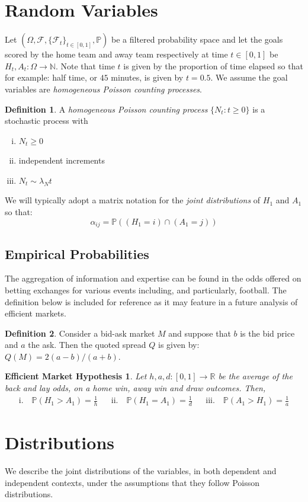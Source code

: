 \documentclass[a4paper,11pt,oneside]{book}
\theoremstyle{plain}
\newtheorem*{emh}{Efficient Market Hypothesis}
\theoremstyle{definition}
\newtheorem{defn}{Definition}[section]
\begin{document}
\section{Random Variables }
Let $(\Omega,\mathcal{F},\{\mathcal{F}_t\}_{t \in [0,1]},\mathbb{P})$ be a filtered probability space and let the goals scored by the home team and away team respectively at time $t \in [0,1]$ be $H_t,A_t:\Omega\rightarrow \mathbb{N}$. Note that time $t$ is given by the proportion of time elapsed so that for example: half time, or $45$ minutes, is given by $t=0.5$. We assume the goal variables are \emph{homogeneous Poisson counting processes}.
\begin{defn} A \emph{homogeneous Poisson counting process} $\{N_t:t \ge 0\}$ is a stochastic process with
\begin{enumerate}[i.]
\item $N_t \ge 0$
\item independent increments
\item $N_t \sim \lambda_Nt$
\end{enumerate} 
\end{defn}
We will typically adopt a matrix notation for the \emph{joint distributions} of $H_1$ and $A_1$ so that: \[\alpha_{ij}=\mathbb{P}((H_1=i)\cap (A_1=j))\]
\subsection{Empirical Probabilities}
The aggregation of information and expertise can be found in the odds offered on betting exchanges for various events including, and particularly, football. The definition below is included for reference as it may feature in a future analysis of efficient markets.
\begin{defn}
Consider a bid-ask market $M$ and suppose that $b$ is the bid price and $a$ the ask. Then the quoted spread $Q$ is given by:
$Q(M)=2(a-b)/(a+b)$.
\end{defn}
\begin{emh}
Let $h,a,d:[0,1]\rightarrow \mathbb{R}$ be the average of the back and lay odds, on a home win, away win and draw outcomes. Then,
\begin{align*}
\text{i.} \quad \mathbb{P}(H_1>A_1)=\frac{1}{h} && \text{ii.} \quad\mathbb{P}(H_1=A_1)=\frac{1}{d} && \text{iii.} \quad\mathbb{P}(A_1>H_1)=\frac{1}{a}
\end{align*}
\end{emh}
\section{Distributions }
We describe the joint distributions of the variables, in both dependent and independent contexts, under the assumptions that they follow Poisson distributions.
\end{document}
